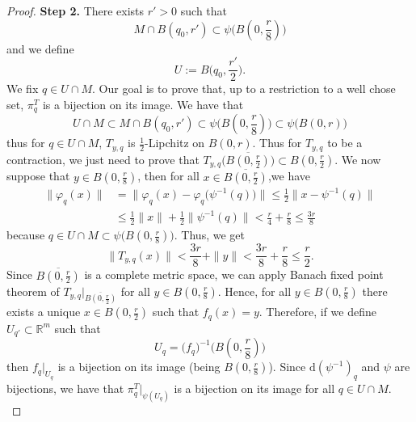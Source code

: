 \documentclass[10pt,a4paper]{amsart}
\newcommand{\R}{\mathbb{R}}
\renewcommand{\d}{\mathrm{d}}
\renewcommand{\leq}{\leqslant}
\begin{document}
\begin{proof}
    \noindent \textbf{Step 2.}
    There exists $r' > 0$ such that 
    $$M \cap B(q_0,r') \subset \psi \big( B(0,\frac{r}{8}) \big)$$ 
    and we define
    $$U := B\Big(q_0, \frac{r'}{2}\Big).$$
    We fix $q \in U \cap M$. 
    Our goal is to prove that, up to a restriction to a well chose set, $\pi^T_{q}$ is a bijection on its image.
    We have that 
    $$U \cap M \subset M \cap B(q_0,r') \subset \psi \big( B(0,\frac{r}{8}) \big) \subset \psi \big( B(0,r) \big)$$
    thus for $q \in U \cap M$, $T_{y,q}$ is $\frac{1}{2}$-Lipchitz on $ B(0,r)$.
    Thus for $T_{y,q}$ to be a contraction, we just need to prove that $T_{y,q} \big( \overline{B(0,\frac{r}{2})} \big) \subset  B(0,\frac{r}{2})$.
    We now suppose that $y \in B(0,\frac{r}{8})$, then for all $x \in \overline{B(0,\frac{r}{2})}$,we have
    \begin{align*}
        \| \varphi_{q}(x) \| &= \| \varphi_{q}(x) - \varphi_{q}\big(\psi^{-1} (q)\big) \| \leq \frac{1}{2} \| x-\psi^{-1}(q) \| \\
        &\leq \frac{1}{2} \| x \| + \frac{1}{2} \| \psi^{-1}(q) \| < \frac{r}{4} + \frac{r}{8} \leq \frac{3r}{8}
    \end{align*}
    because $q \in U \cap M \subset \psi \big( B(0,\frac{r}{8}) \big)$.
    Thus, we get
    $$\|T_{y,q}(x) \| < \frac{3r}{8} + \|y \| <  \frac{3r}{8} + \frac{r}{8} \leq \frac{r}{2}.$$
    Since $  \overline{B(0,\frac{r}{2})}$ is a complete metric space, we can apply Banach fixed point theorem of $T_{y,q} |_{\overline{B(0,\frac{r}{2})}}$ for all $y \in B(0,\frac{r}{8})$.
    Hence, for all $y \in B(0,\frac{r}{8})$ there exists a unique $x \in B(0,\frac{r}{2})$ such that $f_q(x)=y$.
    Therefore, if we define $U_{q'} \subset \R^m$ such that 
    $$U_{q} = \big(f_{q}\big)^{-1} \big( B(0,\frac{r}{8}) \big)$$
    then $f_{q} |_{U_{q}}$ is a bijection on its image (being $B(0,\frac{r}{8})$).
    Since $\d (\psi^{-1})_q$ and $\psi$ are bijections, we have that 
    $\pi^T_{q} |_{\psi(U_{q})}$ is a bijection on its image for all $q \in U \cap M$.\\


\end{proof}
\end{document}
